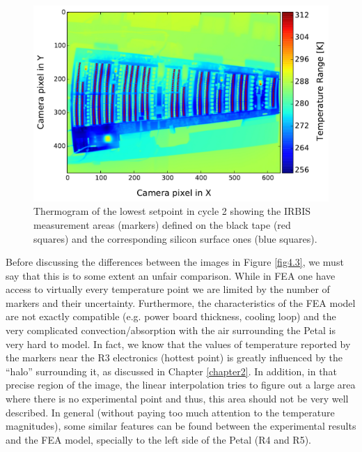 		\begin{figure}[ht!]
			\centering
			\captionsetup{justification=centering,margin=2cm}
			\includegraphics[scale=0.65]{Figures/Chapter04/thermo_Temp_20170803154926.pdf}
			\caption{Thermogram of the lowest setpoint in cycle 2 showing the IRBIS measurement areas (markers) defined on the black tape (red squares) and the corresponding silicon surface ones (blue squares).}\label{fig4.2}
		\end{figure}
		
		Before discussing the differences between the images in Figure \ref{fig4.3}, we must say that this is to some extent an unfair comparison. While in FEA one have access to virtually every temperature point we are limited by the number of markers and their uncertainty. Furthermore, the characteristics of the FEA model are not exactly compatible (e.g. power board thickness, cooling loop) and the very complicated convection/absorption with the air surrounding the Petal is very hard to model. In fact, we know that the values of temperature reported by the markers near the R3 electronics (hottest point) is greatly influenced by the “halo” surrounding it, as discussed in Chapter \ref{chapter2}. In addition, in that precise region of the image, the linear interpolation tries to figure out a large area where there is no experimental point and thus, this area should not be very well described.
		In general (without paying too much attention to the temperature magnitudes), some similar features can be found between the experimental results and the FEA model, specially to the left side of the Petal (R4 and R5).
		
